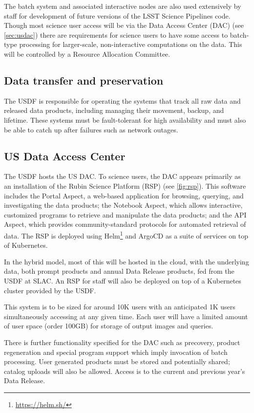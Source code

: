 The batch system and associated interactive nodes are also used extensively by staff for development of future versions of the LSST Science Pipelines code.\cite{2019ASPC..523..521B}
Though most science user access will be via the Data Access Center (DAC) (see \autoref{sec:usdac})
there are requirements for science users to have some access to batch-type processing for larger-scale, non-interactive computations on the data.\cite{DMTN-223}
This will be controlled by a Resource Allocation Committee.

\subsection{Data transfer and preservation} \label{req:dbb}
The USDF is responsible for operating the systems that track all raw data and released data products, including managing their movement, backup, and lifetime.
These systems must be fault-tolerant  for high availability and must also be able to catch up after failures such as network outages.

\subsection{US Data Access Center}\label{sec:usdac}
The USDF hosts the US DAC.
To science users, the DAC appears primarily as an installation of the Rubin Science Platform (RSP)\cite{LDM-542} (see \autoref{fig:rsp}).
This software includes the Portal Aspect, a web-based application for browsing, querying, and investigating the data products; the Notebook Aspect, which allows interactive, customized programs to retrieve and manipulate the data products; and the API Aspect, which provides community-standard protocols for automated retrieval of data.
The RSP is deployed using Helm\footnote{\url{https://helm.sh/}} and ArgoCD as a suite of services on top of Kubernetes.

In the hybrid model, most of this will be hosted in the cloud, with the underlying data, both prompt products and annual Data Release products, fed from the USDF at SLAC.
An RSP for staff will also be deployed on top of a Kubernetes cluster provided by the USDF.

This system is to be sized for around 10K users with an anticipated 1K users simultaneously accessing at any given time.
Each user will have a limited amount of user space (order 100GB) for storage of output images and queries.

There is further functionality specified for the DAC such as precovery, product regeneration and special program support which imply invocation
of batch processing.
User generated products must be stored and potentially shared; catalog uploads will also be allowed.
Access is to the current and previous year's Data Release.
